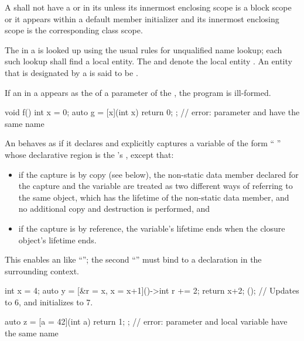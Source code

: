 \pnum
A  shall not have
a  or 
in its 
unless its innermost enclosing scope is a block scope
or it appears within a default member initializer
and its innermost enclosing scope is
the corresponding class scope.

\pnum
The  in a  is looked up using the
usual rules for unqualified name lookup; each such lookup
shall find a local entity.
The   and 
denote the local entity .
An entity that is designated by a
is said to be .

\pnum
If an  in a  appears
as the  of a parameter of
the  ,
the program is ill-formed.
\begin{example}
\begin{codeblock}
void f() {
  int x = 0;
  auto g = [x](int x) { return 0; };    // error: parameter and  have the same name
}
\end{codeblock}
\end{example}

\pnum
An  behaves as if it declares and explicitly captures a
variable of
the form ``  \tcode{;}''
whose declarative region is the 's
, except that:
\begin{itemize}
\item if the capture is by copy (see below), the non-static data member
declared for the capture and the variable are treated as two different ways
of referring to the same object, which has the lifetime of the non-static
data member, and no additional copy and destruction is performed, and
\item if the capture is by reference, the variable's lifetime ends when the
closure object's lifetime ends.
\end{itemize}
\begin{note}
This enables an  like
``''; the second ``'' must bind to a
declaration in the surrounding context.
\end{note}
\begin{example}
\begin{codeblock}
int x = 4;
auto y = [&r = x, x = x+1]()->int {
            r += 2;
            return x+2;
         }();                               // Updates  to 6, and initializes  to 7.

auto z = [a = 42](int a) { return 1; };     // error: parameter and local variable have the same name
\end{codeblock}
\end{example}

